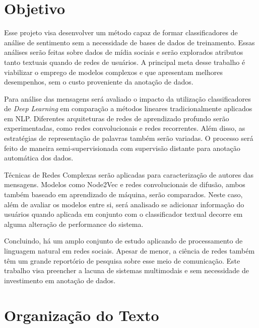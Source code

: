 \section{Objetivo}

Esse projeto visa desenvolver um método capaz de formar classificadores de
análise de sentimento sem a necessidade de bases de dados de treinamento.
Essas análises serão feitas sobre dados de mídia sociais e serão explorados
atributos tanto textuais quando de redes de usuários.
A principal meta desse trabalho é viabilizar o emprego de modelos complexos e
que apresentam melhores desempenhos, sem o custo proveniente da anotação de
dados.

Para análise das mensagens será avaliado o impacto da utilização classificadores
de \textit{Deep Learning} em comparação a métodos lineares tradicionalmente
aplicados em NLP.
Diferentes arquiteturas de redes de aprendizado profundo serão experimentadas,
como redes convolucionais e redes recorrentes.
Além disso, as estratégias de representação de palavras também serão variadas.
O processo será feito de maneira semi-supervisionada com supervisão distante
para anotação automática dos dados.

Técnicas de Redes Complexas serão aplicadas para caracterização de autores das
mensagens.
Modelos como Node2Vec e redes convolucionais de difusão, ambos também baseado em
aprendizado de máquina, serão comparados.
Neste caso, além de avaliar os modelos entre si, será analisado se adicionar
informação do usuários quando aplicada em conjunto com o classificador textual
decorre em alguma alteração de performance do sistema.

Concluindo, há um amplo conjunto de estudo aplicando de processamento de
linguagem natural em redes sociais.
Apesar de menor, a ciência de redes também têm um grande reportório de pesquisa
sobre esse meio de comunicação.
Este trabalho visa preencher a lacuna de sistemas multimodais e sem necessidade
de investimento em anotação de dados.

\section{Organização do Texto}
